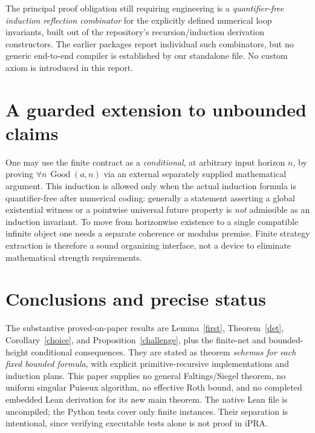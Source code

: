 \documentclass[11pt]{article}
\begin{document}
The principal proof obligation still requiring engineering is a \emph{quantifier-free induction reflection combinator} for the explicitly defined numerical loop invariants, built out of the repository's recursion/induction derivation constructors. The earlier packages report individual such combinators, but no generic end-to-end compiler is established by our standalone file. No custom axiom is introduced in this report.

\section{A guarded extension to unbounded claims}
One may use the finite contract as a \emph{conditional}, at arbitrary input horizon $n$, by proving $\forall n\,\operatorname{Good}(a,n)$ via an external separately supplied mathematical argument. This induction is allowed only when the actual induction formula is quantifier-free after numerical coding: generally a statement asserting a global existential witness or a pointwise universal future property is \emph{not} admissible as an induction invariant. To move from horizonwise existence to a single compatible infinite object one needs a separate coherence or modulus premise. Finite strategy extraction is therefore a sound organizing interface, not a device to eliminate mathematical strength requirements.

\section{Conclusions and precise status}
The substantive proved-on-paper results are Lemma~\ref{first}, Theorem~\ref{det}, Corollary~\ref{choice}, and Proposition~\ref{challenge}, plus the finite-net and bounded-height conditional consequences. They are stated as theorem \emph{schemas for each fixed bounded formula}, with explicit primitive-recursive implementations and induction plans. This paper supplies no general Faltings/Siegel theorem, no uniform singular Puiseux algorithm, no effective Roth bound, and no completed embedded Lean derivation for its new main theorem. The native Lean file is uncompiled; the Python tests cover only finite instances. Their separation is intentional, since verifying executable tests alone is not proof in iPRA.
\end{document}
